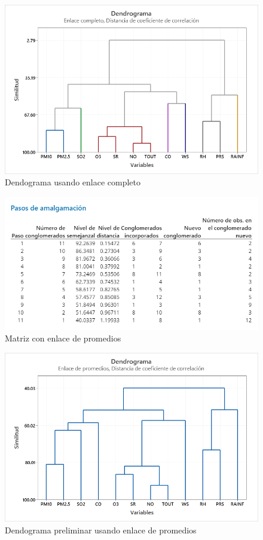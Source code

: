 \documentclass[journal, 10pt]{IEEEtran}                                                          %
\begin{document}
\begin{figure}[H]
    \centering
    \includegraphics[scale=.3]{dendogramaCompleto.png}
    \caption{Dendograma usando enlace completo}
    \label{fig:dendogramaCompleto}
\end{figure}








\begin{figure}[H]
    \centering
    \includegraphics[scale=.3]{matrizAvg.png}
    \caption{Matriz con enlace de promedios}
    \label{fig:matrizAvg}
\end{figure}

\begin{figure}[H]
    \centering
    \includegraphics[scale=.3]{gramaPromedio.png}
    \caption{Dendograma preliminar usando enlace de promedios}
    \label{fig:gramaAvg}
\end{figure}
\end{document}

